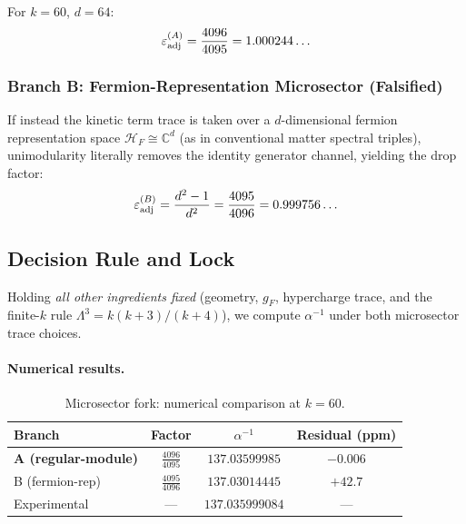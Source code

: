 For $k = 60$, $d = 64$:
\begin{equation}
\varepsilon_{\rm adj}^{(A)} = \frac{4096}{4095} = 1.000244\ldots
\end{equation}

\subsubsection{Branch B: Fermion-Representation Microsector (Falsified)}

If instead the kinetic term trace is taken over a $d$-dimensional fermion representation space $\mathcal{H}_F \cong \mathbb{C}^d$ (as in conventional matter spectral triples), unimodularity literally removes the identity generator channel, yielding the drop factor:
\begin{equation}\label{eq:drop-factor}
\varepsilon_{\rm adj}^{(B)} = \frac{d^2 - 1}{d^2} = \frac{4095}{4096} = 0.999756\ldots
\end{equation}

\subsection{Decision Rule and Lock}\label{sec:alpha-decision-rule}

Holding \emph{all other ingredients fixed} (geometry, $g_F$, hypercharge trace, and the finite-$k$ rule $\Lambda^3 = k(k+3)/(k+4)$), we compute $\alpha^{-1}$ under both microsector trace choices.

\paragraph{Numerical results.}

\begin{table}[h]
\centering
\caption{Microsector fork: numerical comparison at $k = 60$.}\label{tab:microsector-fork}
\renewcommand{\arraystretch}{1.3}
\begin{tabular}{lccc}
\toprule
Branch & Factor & $\alpha^{-1}$ & Residual (ppm) \\
\midrule
\textbf{A (regular-module)} & $\displaystyle\frac{4096}{4095}$ & $137.03599985$ & $-0.006$ \\[8pt]
B (fermion-rep) & $\displaystyle\frac{4095}{4096}$ & $137.03014445$ & $+42.7$ \\
\midrule
Experimental & --- & $137.035999084$ & --- \\
\bottomrule
\end{tabular}
\end{table}

